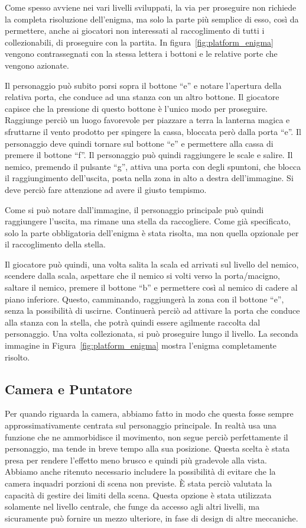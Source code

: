 Come spesso avviene nei vari livelli sviluppati, la via per proseguire non richiede la completa risoluzione dell’enigma, ma solo la parte più semplice di esso, così da permettere, anche ai giocatori non interessati al raccoglimento di tutti i collezionabili, di proseguire con la partita.
In figura~\ref{fig:platform_enigma} vengono contrassegnati con la stessa lettera i bottoni e le relative porte che vengono azionate.

Il personaggio può subito porsi sopra il bottone “e” e notare l’apertura della relativa porta, che conduce ad una stanza con un altro bottone. Il giocatore capisce che la pressione di questo bottone è l’unico modo per proseguire. Raggiunge perciò un luogo favorevole per piazzare a terra la lanterna magica e sfruttarne il vento prodotto per spingere la cassa, bloccata però dalla porta “e”. Il personaggio deve quindi tornare sul bottone “e” e permettere alla cassa di premere il bottone “f”. Il personaggio può quindi raggiungere le scale e salire. Il nemico, premendo il pulsante “g”, attiva una porta con degli spuntoni, che blocca il raggiungimento dell’uscita, posta nella zona in alto a destra dell’immagine. Si deve perciò fare attenzione ad avere il giusto tempismo.

Come si può notare dall’immagine, il personaggio principale può quindi raggiungere l’uscita, ma rimane una stella da raccogliere. Come già specificato, solo la parte obbligatoria dell’enigma è stata risolta, ma non quella opzionale per il raccoglimento della stella.

Il giocatore può quindi, una volta salita la scala ed arrivati sul livello del nemico, scendere dalla scala, aspettare che il nemico si volti verso la porta/macigno, saltare il nemico, premere il bottone “b” e permettere così al nemico di cadere al piano inferiore. Questo, camminando, raggiungerà la zona con il bottone “e”, senza la possibilità di uscirne. Continuerà perciò ad attivare la porta che conduce alla stanza con la stella, che potrà quindi essere agilmente raccolta dal personaggio. Una volta collezionata, si può proseguire lungo il livello.
La seconda immagine in Figura~\ref{fig:platform_enigma} mostra l’enigma completamente risolto.

\subsection{Camera e Puntatore}
\label{sec:camera_e_puntatore}

Per quando riguarda la camera, abbiamo fatto in modo che questa fosse sempre approssimativamente centrata sul personaggio principale. In realtà usa una funzione che ne ammorbidisce il movimento, non segue perciò perfettamente il personaggio, ma tende in breve tempo alla sua posizione. Questa scelta è stata presa per rendere l’effetto meno brusco e quindi più gradevole alla vista.
Abbiamo anche ritenuto necessario includere la possibilità di evitare che la camera inquadri porzioni di scena non previste. È stata perciò valutata la capacità di gestire dei limiti della scena. Questa opzione è stata utilizzata solamente nel livello centrale, che funge da accesso agli altri livelli, ma sicuramente può fornire un mezzo ulteriore, in fase di design di altre meccaniche.

